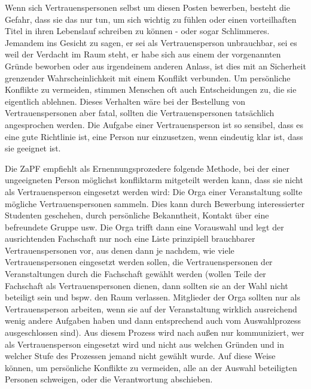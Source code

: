 \documentclass[DIV=calc]{scrartcl}
\begin{document}
Wenn sich Vertrauenspersonen selbst um diesen Posten bewerben, besteht die Gefahr, dass sie das nur tun, um sich wichtig zu fühlen oder einen vorteilhaften Titel in ihren Lebenslauf schreiben zu können - oder sogar Schlimmeres. Jemandem ins Gesicht zu sagen, er sei als Vertrauensperson unbrauchbar, sei es weil der Verdacht im Raum steht, er habe sich aus einem der vorgenannten Gründe beworben oder aus irgendeinem anderen Anlass, ist dies mit an Sicherheit grenzender Wahrscheinlichkeit mit einem Konflikt verbunden. Um persönliche Konflikte zu vermeiden, stimmen Menschen oft auch Entscheidungen zu, die sie eigentlich ablehnen. Dieses Verhalten wäre bei der Bestellung von Vertrauenspersonen aber fatal, sollten die Vertrauenspersonen tatsächlich angesprochen werden. Die Aufgabe einer Vertrauensperson ist so sensibel, dass es eine gute Richtlinie ist, eine Person nur einzusetzen, wenn eindeutig klar ist, dass sie geeignet ist.

\begin{center}\end{center}

Die ZaPF empfiehlt als Ernennungsprozedere folgende Methode, bei der einer ungeeigneten Person möglichst konfliktarm mitgeteilt werden kann, dass sie nicht als Vertrauensperson eingesetzt werden wird:
Die Orga einer Veranstaltung sollte mögliche Vertrauenspersonen sammeln. Dies kann durch Bewerbung interessierter Studenten geschehen, durch persönliche Bekanntheit, Kontakt über eine befreundete Gruppe usw. Die Orga trifft dann eine Vorauswahl und legt der ausrichtenden Fachschaft nur noch eine Liste prinzipiell brauchbarer Vertrauenspersonen vor, aus denen dann je nachdem, wie viele Vertrauenspersonen eingesetzt werden sollen, die Vertrauenspersonen der Veranstaltungen durch die Fachschaft gewählt werden (wollen Teile der Fachschaft als Vertrauenspersonen dienen, dann sollten sie an der Wahl nicht beteiligt sein und bspw. den Raum verlassen. Mitglieder der Orga sollten nur als Vertrauensperson arbeiten, wenn sie auf der Veranstaltung wirklich ausreichend wenig andere Aufgaben haben und dann entsprechend auch vom Auswahlprozess ausgeschlossen sind).
Aus diesem Prozess wird nach außen nur kommuniziert, wer als Vertrauensperson eingesetzt wird und nicht aus welchen Gründen und in welcher Stufe des Prozessen jemand nicht gewählt wurde. Auf diese Weise können, um persönliche Konflikte zu vermeiden, alle an der Auswahl beteiligten Personen schweigen, oder die Verantwortung abschieben.
\end{document}
